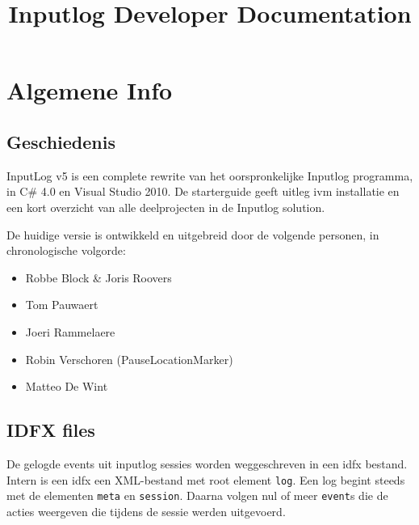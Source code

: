 \documentclass[a4paper,11pt]{report}
\begin{document}
\title{Inputlog Developer Documentation}
\author{}
\maketitle

\tableofcontents
\chapter{Algemene Info}
\section{Geschiedenis}
InputLog v5 is een complete rewrite van het oorspronkelijke Inputlog programma, in C\# 4.0 en Visual Studio 2010. De starterguide geeft uitleg ivm installatie en een kort overzicht van alle deelprojecten in de Inputlog solution. 

De huidige versie is ontwikkeld en uitgebreid door de volgende personen, in chronologische volgorde:
\begin{itemize}
\item Robbe Block \& Joris Roovers
\item Tom Pauwaert
\item Joeri Rammelaere
\item Robin Verschoren (PauseLocationMarker)
\item Matteo De Wint
\end{itemize}

\section{IDFX files}
De gelogde events uit inputlog sessies worden weggeschreven in een idfx bestand. Intern is een idfx een XML-bestand met root element \texttt{log}. Een log begint steeds met de elementen \texttt{meta} en \texttt{session}. Daarna volgen nul of meer \texttt{event}s die de acties weergeven die tijdens de sessie werden uitgevoerd.
\end{document}
